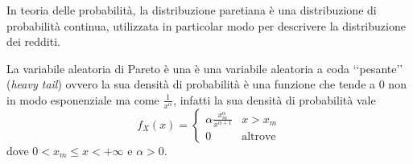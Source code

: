 In teoria delle probabilità, la distribuzione paretiana è una distribuzione di probabilità continua, utilizzata in particolar modo per descrivere la distribuzione dei redditi.

La variabile aleatoria di Pareto è una è una variabile aleatoria a coda ‘‘pesante’’ (\textit{heavy tail}) ovvero la sua densità di probabilità è una funzione che tende a $0$ non in modo esponenziale ma come $\frac{1}{x^{\alpha}}$, infatti la sua densità di probabilità vale
\begin{equation}
	f_X(x) =
	\begin{cases}
		\alpha \frac{x_m^\alpha}{x^{\alpha + 1}} & x>x_m \\
		0 & \text{altrove}
	\end{cases}
\end{equation}
dove $0 < x_m \leq x < +\infty$ e $\alpha > 0$.

